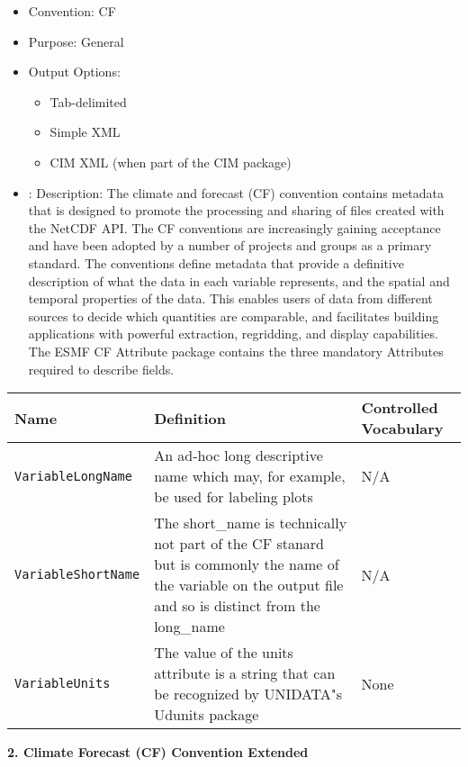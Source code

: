 \begin{itemize}
    \item Convention: CF
    \item Purpose: General
    \item Output Options:
    \begin{itemize}
        \item Tab-delimited
        \item Simple XML
        \item CIM XML (when part of the CIM package)
    \end{itemize} 
    \item: Description: The climate and forecast (CF) convention contains metadata that is designed to promote the processing and sharing of files created with the NetCDF API. The CF conventions are increasingly gaining acceptance and have been adopted by a number of projects and groups as a primary standard. The conventions define metadata that provide a definitive description of what the data in each variable represents, and the spatial and temporal properties of the data. This enables users of data from different sources to decide which quantities are comparable, and facilitates building applications with powerful extraction, regridding, and display capabilities. The ESMF CF Attribute package contains the three mandatory Attributes required to describe fields.  
\end{itemize}

\begin{tabular}{|p{8cm}|p{20cm}|p{10cm}|}
    {\bf Name } & {\bf Definition} & {\bf Controlled Vocabulary} \\
    \hline\hline
    {\tt VariableLongName} & An ad-hoc long descriptive name which may, for example, be used for labeling plots & N/A\\
    {\tt VariableShortName}  & The short\_name is technically not part of the CF stanard but is commonly the name of the variable on the output file and so is distinct from the long\_name & N/A \\
    {\tt VariableUnits}  & The value of the units attribute is a string that can be recognized by UNIDATA"s Udunits package & None\\
\end{tabular}




\vspace{.20in}
{\bf 2. Climate Forecast (CF) Convention Extended}

